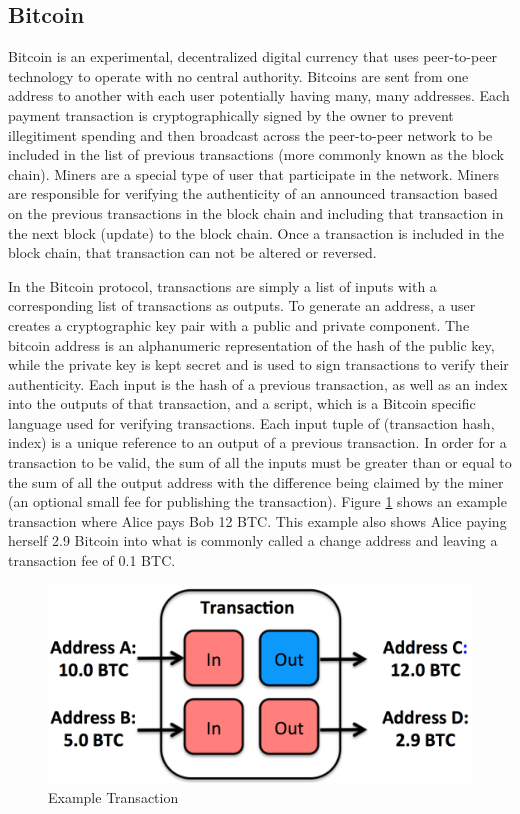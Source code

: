 \documentclass[10pt, letterpaper, twocolumn, twoside]{article}
\begin{document}
\subsection{Bitcoin}
Bitcoin is an experimental, decentralized digital currency that uses peer-to-peer technology to operate with no central authority. Bitcoins are sent from one address to another with each user potentially having many, many addresses. Each payment transaction is cryptographically signed by the owner to prevent illegitiment spending and then broadcast across the peer-to-peer network to be included in the list of previous transactions (more commonly known as the block chain). Miners are a special type of user that participate in the network. Miners are responsible for verifying the authenticity of an announced transaction based on the previous transactions in the block chain and including that transaction in the next block (update) to the block chain. Once a transaction is included in the block chain, that transaction can not be altered or reversed.

In the Bitcoin protocol, transactions are simply a list of inputs with a corresponding list of transactions as outputs. To generate an address, a user creates a cryptographic key pair with a public and private component. The bitcoin address is an alphanumeric representation of the hash of the public key, while the private key is kept secret and is used to sign transactions to verify their authenticity. Each input is the hash of a previous transaction, as well as an index into the outputs of that transaction, and a script, which is a Bitcoin specific language used for verifying transactions. Each input tuple of (transaction hash, index) is a unique reference to an output of a previous transaction. In order for a transaction to be valid, the sum of all the inputs must be greater than or equal to the sum of all the output address with the difference being claimed by the miner (an optional small fee for publishing the transaction).  Figure \ref{fig:transaction} shows an example transaction where Alice pays Bob 12 BTC. This example also shows Alice paying herself 2.9 Bitcoin into what is commonly called a change address and leaving a transaction fee of 0.1 BTC.

\begin{figure}
  \includegraphics[width=\linewidth]{transaction2.png}
  \caption{Example Transaction}
  \label{fig:transaction}
\end{figure}
\end{document}
